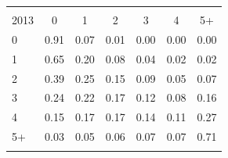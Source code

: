\begin{tabular}{lcccccc}
\hline \noalign{\smallskip}\multicolumn{7}{c}{2014}\\
2013 & 0 & 1 & 2 & 3 & 4 & 5+\\
\noalign{\smallskip}\hline \noalign{\smallskip}0 & 0.91 & 0.07 & 0.01 & 0.00 & 0.00 & 0.00\\
1 & 0.65 & 0.20 & 0.08 & 0.04 & 0.02 & 0.02\\
2 & 0.39 & 0.25 & 0.15 & 0.09 & 0.05 & 0.07\\
3 & 0.24 & 0.22 & 0.17 & 0.12 & 0.08 & 0.16\\
4 & 0.15 & 0.17 & 0.17 & 0.14 & 0.11 & 0.27\\
5+ & 0.03 & 0.05 & 0.06 & 0.07 & 0.07 & 0.71\\
\noalign{\smallskip}\hline\end{tabular}\\
